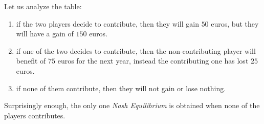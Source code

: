 \documentclass{article}
\begin{document}
\noindent Let us analyze the table:
\begin{enumerate}
    \item if the two players decide to contribute, then they will gain $50$ euros, but they will have a gain of $150$ euros.
    \item if one of the two decides to contribute, then the non-contributing player will benefit of $75$ euros for the next year, instead the contributing one has lost $25$ euros.
    \item if none of them contribute, then they will not gain or lose nothing.
\end{enumerate}

\noindent Surprisingly enough, the only one \textit{Nash Equilibrium} is obtained when none of the players contributes.
\end{document}
